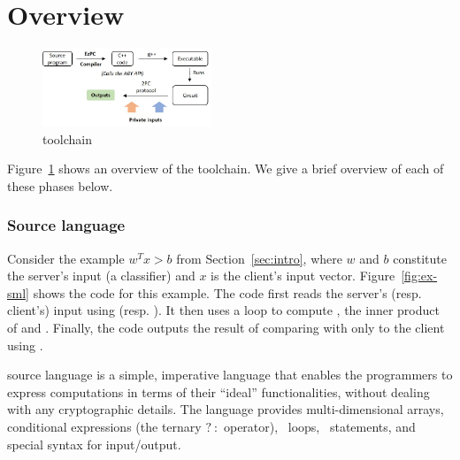 \section{\tool Overview}
\label{sec:ex}

\begin{figure}
  \includegraphics[width=0.45\textwidth]{toolchain}
\caption{\tool toolchain}
\label{fig:toolchain}
\end{figure}

Figure~\ref{fig:toolchain} shows an overview of the \tool
toolchain. We give a brief overview of each of these phases below.

\subsubsection*{Source language}
Consider the example $w^Tx >b$ from Section~\ref{sec:intro}, where
$w$ and $b$ constitute the server's input (a classifier) and $x$ is
the client's input vector. Figure~\ref{fig:ex-sml} shows the \tool code
for this example. The code first reads the server's (resp. client's) input using
  (resp. ). It then uses a
 loop to compute , the inner product of  and
. Finally, the code outputs the result of comparing 
with  only to the client using .

\tool source language is a simple, imperative language that enables
the programmers to express \mpc computations in terms of their
``ideal'' functionalities, without dealing with any cryptographic
details. The language provides multi-dimensional arrays, conditional
expressions (the ternary $?\::$ operator), ~loops,
~statements, and special syntax for input/output.



